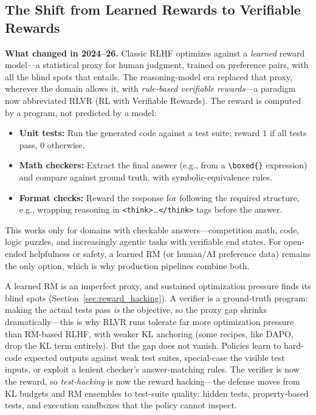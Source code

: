 \subsection{The Shift from Learned Rewards to Verifiable Rewards}

\textbf{What changed in 2024--26.} Classic RLHF optimizes against a \textit{learned} reward model---a statistical proxy for human judgment, trained on preference pairs, with all the blind spots that entails. The reasoning-model era replaced that proxy, wherever the domain allows it, with \textit{rule-based verifiable rewards}---a paradigm now abbreviated RLVR (RL with Verifiable Rewards). The reward is computed by a program, not predicted by a model:
\begin{itemize}
    \item \textbf{Unit tests:} Run the generated code against a test suite; reward $1$ if all tests pass, $0$ otherwise.
    \item \textbf{Math checkers:} Extract the final answer (e.g., from a \texttt{\textbackslash boxed\{\}} expression) and compare against ground truth, with symbolic-equivalence rules.
    \item \textbf{Format checks:} Reward the response for following the required structure, e.g., wrapping reasoning in \texttt{<think>}\ldots\texttt{</think>} tags before the answer.
\end{itemize}
This works only for domains with checkable answers---competition math, code, logic puzzles, and increasingly agentic tasks with verifiable end states. For open-ended helpfulness or safety, a learned RM (or human/AI preference data) remains the only option, which is why production pipelines combine both.

\begin{keyinsight}
A learned RM is an imperfect proxy, and sustained optimization pressure finds its blind spots (Section~\ref{sec:reward_hacking}). A verifier is a ground-truth program: making the actual tests pass \textit{is} the objective, so the proxy gap shrinks dramatically---this is why RLVR runs tolerate far more optimization pressure than RM-based RLHF, with weaker KL anchoring (some recipes, like DAPO, drop the KL term entirely). But the gap does not vanish. Policies learn to hard-code expected outputs against weak test suites, special-case the visible test inputs, or exploit a lenient checker's answer-matching rules. The verifier is now the reward, so \textit{test-hacking} is now the reward hacking---the defense moves from KL budgets and RM ensembles to test-suite quality: hidden tests, property-based tests, and execution sandboxes that the policy cannot inspect.
\end{keyinsight}

